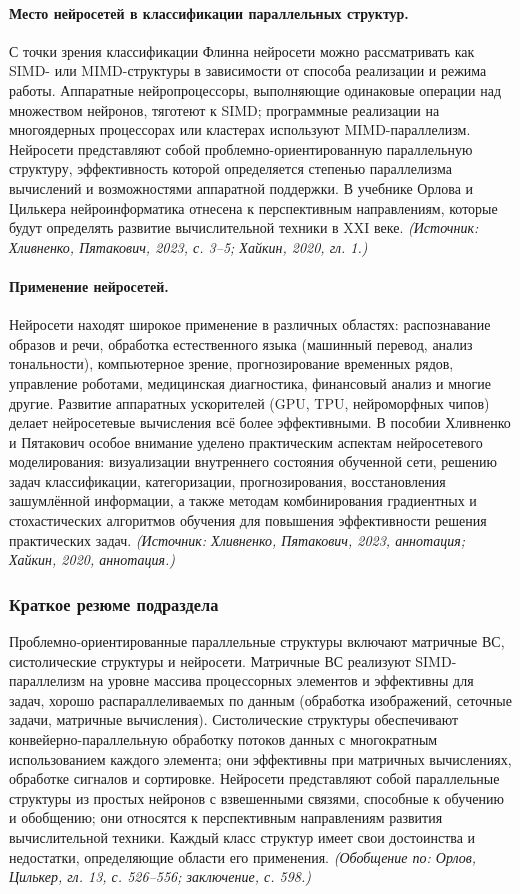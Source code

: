 \documentclass[a4paper,12pt]{article}
\begin{document}
\paragraph{Место нейросетей в классификации параллельных структур.}
С точки зрения классификации Флинна нейросети можно рассматривать как SIMD- или MIMD-структуры в зависимости от способа реализации и режима работы. Аппаратные нейропроцессоры, выполняющие одинаковые операции над множеством нейронов, тяготеют к SIMD; программные реализации на многоядерных процессорах или кластерах используют MIMD-параллелизм. Нейросети представляют собой проблемно-ориентированную параллельную структуру, эффективность которой определяется степенью параллелизма вычислений и возможностями аппаратной поддержки. В учебнике Орлова и Цилькера нейроинформатика отнесена к перспективным направлениям, которые будут определять развитие вычислительной техники в XXI веке.
\textit{(Источник: Хливненко, Пятакович, 2023, с. 3--5; Хайкин, 2020, гл. 1.)}

\paragraph{Применение нейросетей.}
Нейросети находят широкое применение в различных областях: распознавание образов и речи, обработка естественного языка (машинный перевод, анализ тональности), компьютерное зрение, прогнозирование временных рядов, управление роботами, медицинская диагностика, финансовый анализ и многие другие. Развитие аппаратных ускорителей (GPU, TPU, нейроморфных чипов) делает нейросетевые вычисления всё более эффективными. В пособии Хливненко и Пятакович особое внимание уделено практическим аспектам нейросетевого моделирования: визуализации внутреннего состояния обученной сети, решению задач классификации, категоризации, прогнозирования, восстановления зашумлённой информации, а также методам комбинирования градиентных и стохастических алгоритмов обучения для повышения эффективности решения практических задач.
\textit{(Источник: Хливненко, Пятакович, 2023, аннотация; Хайкин, 2020, аннотация.)}

\subsubsection{Краткое резюме подраздела}
Проблемно-ориентированные параллельные структуры включают матричные ВС, систолические структуры и нейросети. Матричные ВС реализуют SIMD-параллелизм на уровне массива процессорных элементов и эффективны для задач, хорошо распараллеливаемых по данным (обработка изображений, сеточные задачи, матричные вычисления). Систолические структуры обеспечивают конвейерно-параллельную обработку потоков данных с многократным использованием каждого элемента; они эффективны при матричных вычислениях, обработке сигналов и сортировке. Нейросети представляют собой параллельные структуры из простых нейронов с взвешенными связями, способные к обучению и обобщению; они относятся к перспективным направлениям развития вычислительной техники. Каждый класс структур имеет свои достоинства и недостатки, определяющие области его применения.
\textit{(Обобщение по: Орлов, Цилькер, гл. 13, с. 526--556; заключение, с. 598.)}
\end{document}
